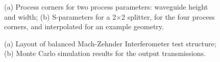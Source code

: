 \documentclass[journal]{spie}
\begin{document}
\begin{figure}[tbp]
	\centering
{} 
    \caption[]{(a) Process corners for two process parameters: waveguide height and width; (b) S-parameters for  a 2$\times$2  splitter, for the four process corners, and interpolated for an example geometry.}
    \label{s-interpolation}
\end{figure}

\begin{figure}[h]
	\centering
{} 
    \caption[]{(a) Layout of balanced Mach-Zehnder Interferometer test structure; (b) Monte Carlo simulation results for the output transmissions.}
    \label{MZI_common_MC}
\end{figure}
\end{document}
